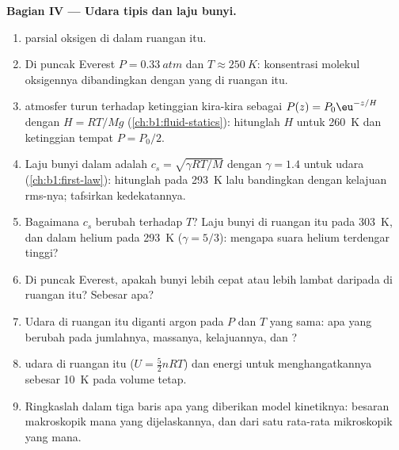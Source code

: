 \begin{problem}
\medskip
\noindent\textbf{Bagian IV --- Udara tipis dan laju bunyi.}
\begin{enumerate}[resume]
  \item {} parsial oksigen di dalam ruangan itu.
  \item Di puncak Everest $P = \qty{0.33}{atm}$ dan $T \approx \qty{250}{K}$:
        konsentrasi molekul oksigennya dibandingkan dengan yang di ruangan itu.
  \item {} atmosfer turun terhadap ketinggian kira-kira sebagai
        $P(z) = P_0\eu^{-z/H}$ dengan $H = RT/Mg$ (\cref{ch:b1:fluid-statics}):
        hitunglah $H$ untuk \qty{260}{K} dan ketinggian tempat $P = P_0/2$.
  \item Laju bunyi dalam  adalah $c_s = \sqrt{\gamma RT/M}$
        dengan $\gamma = 1.4$ untuk udara (\cref{ch:b1:first-law}): hitunglah pada
        \qty{293}{K} lalu bandingkan dengan kelajuan rms-nya; tafsirkan
        kedekatannya.
  \item Bagaimana $c_s$ berubah terhadap $T$? Laju bunyi di ruangan itu pada
        \qty{303}{K}, dan dalam helium pada \qty{293}{K} ($\gamma = 5/3$): mengapa
        suara helium terdengar tinggi?
  \item Di puncak Everest, apakah bunyi lebih cepat atau lebih lambat daripada di
        ruangan itu? Sebesar apa?
  \item Udara di ruangan itu diganti argon pada $P$ dan $T$ yang sama:
        apa yang berubah pada jumlahnya, massanya, kelajuannya, dan ?
  \item {} udara di ruangan itu ($U = \tfrac52 nRT$) dan
        energi untuk menghangatkannya sebesar \qty{10}{K} pada volume tetap.
  \item Ringkaslah dalam tiga baris apa yang diberikan model kinetiknya: besaran
        makroskopik mana yang dijelaskannya, dan dari satu rata-rata
        mikroskopik yang mana.
\end{enumerate}
\end{problem}
